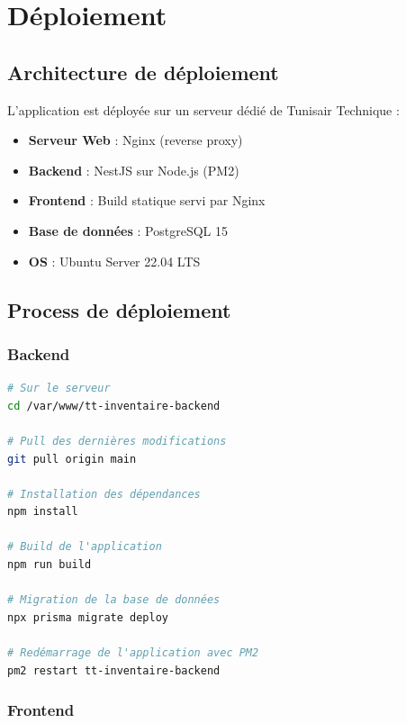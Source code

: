 \section{Déploiement}

\subsection{Architecture de déploiement}

L'application est déployée sur un serveur dédié de Tunisair Technique :

\begin{itemize}
    \item \textbf{Serveur Web} : Nginx (reverse proxy)
    \item \textbf{Backend} : NestJS sur Node.js (PM2)
    \item \textbf{Frontend} : Build statique servi par Nginx
    \item \textbf{Base de données} : PostgreSQL 15
    \item \textbf{OS} : Ubuntu Server 22.04 LTS
\end{itemize}

\subsection{Process de déploiement}

\subsubsection{Backend}

\begin{lstlisting}[language=bash, caption=Déploiement du backend]
# Sur le serveur
cd /var/www/tt-inventaire-backend

# Pull des dernières modifications
git pull origin main

# Installation des dépendances
npm install

# Build de l'application
npm run build

# Migration de la base de données
npx prisma migrate deploy

# Redémarrage de l'application avec PM2
pm2 restart tt-inventaire-backend
\end{lstlisting}

\subsubsection{Frontend}

